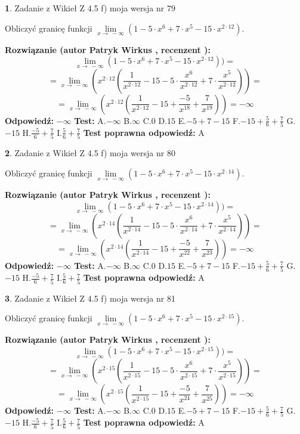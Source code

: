 \documentclass[12pt, a4paper]{article}
\theoremstyle{definition} %
\newtheorem{zad}{}
\newcommand{\zadStart}[1]{\begin{zad}#1\newline}
\newcommand{\zadStop}{\end{zad}}
\newcommand{\rozwStart}[2]{\noindent \textbf{Rozwiązanie (autor #1 , recenzent #2): }\newline}
\newcommand{\rozwStop}{\newline}
\newcommand{\odpStart}{\noindent \textbf{Odpowiedź:}\newline}
\newcommand{\odpStop}{\newline}
\newcommand{\testStart}{\noindent \textbf{Test:}\newline}
\newcommand{\testStop}{\newline}
\newcommand{\kluczStart}{\noindent \textbf{Test poprawna odpowiedź:}\newline}
\newcommand{\kluczStop}{\newline}
\begin{document}
\zadStart{Zadanie z Wikieł Z 4.5 f) moja wersja nr 79}



Obliczyć granicę funkcji  $\lim\limits_{x\to\ -\infty}(1 - 5 \cdot x^{6}+7 \cdot x^{5}- 15 \cdot x^{2\cdot12})$.
\zadStop
\rozwStart{Patryk Wirkus}{}
$$\lim\limits_{x\to\ -\infty}(1 - 5 \cdot x^{6}+7 \cdot x^{5}- 15 \cdot x^{2\cdot12}))=$$
$$=\lim\limits_{x\to\ -\infty}(x^{2\cdot12}(\frac{1}{x^{2\cdot12}}-15 -5 \cdot \frac{x^{6}}{x^{2\cdot12}}+7 \cdot \frac{x^{5}}{x^{2\cdot12}}))=$$
$$=\lim\limits_{x\to\ -\infty}(x^{2\cdot12}(\frac{1}{x^{2\cdot12}}-15 + \frac{-5}{x^{18}}+ \frac{7}{x^{19}}))=-\infty$$
\rozwStop
\odpStart
$-\infty$
\odpStop
\testStart
A.$-\infty$ B.$\infty$ C.$0$ D.$15$ E.$-5 + 7 - 15$
F.$-15+\frac{5}{6}+\frac{7}{5}$ G.$-15$
H.$\frac{-5}{6}+\frac{7}{5}$
I.$\frac{5}{6}+\frac{7}{5}$
\testStop
\kluczStart
A
\kluczStop



\zadStart{Zadanie z Wikieł Z 4.5 f) moja wersja nr 80}



Obliczyć granicę funkcji  $\lim\limits_{x\to\ -\infty}(1 - 5 \cdot x^{6}+7 \cdot x^{5}- 15 \cdot x^{2\cdot14})$.
\zadStop
\rozwStart{Patryk Wirkus}{}
$$\lim\limits_{x\to\ -\infty}(1 - 5 \cdot x^{6}+7 \cdot x^{5}- 15 \cdot x^{2\cdot14}))=$$
$$=\lim\limits_{x\to\ -\infty}(x^{2\cdot14}(\frac{1}{x^{2\cdot14}}-15 -5 \cdot \frac{x^{6}}{x^{2\cdot14}}+7 \cdot \frac{x^{5}}{x^{2\cdot14}}))=$$
$$=\lim\limits_{x\to\ -\infty}(x^{2\cdot14}(\frac{1}{x^{2\cdot14}}-15 + \frac{-5}{x^{22}}+ \frac{7}{x^{23}}))=-\infty$$
\rozwStop
\odpStart
$-\infty$
\odpStop
\testStart
A.$-\infty$ B.$\infty$ C.$0$ D.$15$ E.$-5 + 7 - 15$
F.$-15+\frac{5}{6}+\frac{7}{5}$ G.$-15$
H.$\frac{-5}{6}+\frac{7}{5}$
I.$\frac{5}{6}+\frac{7}{5}$
\testStop
\kluczStart
A
\kluczStop



\zadStart{Zadanie z Wikieł Z 4.5 f) moja wersja nr 81}



Obliczyć granicę funkcji  $\lim\limits_{x\to\ -\infty}(1 - 5 \cdot x^{6}+7 \cdot x^{5}- 15 \cdot x^{2\cdot15})$.
\zadStop
\rozwStart{Patryk Wirkus}{}
$$\lim\limits_{x\to\ -\infty}(1 - 5 \cdot x^{6}+7 \cdot x^{5}- 15 \cdot x^{2\cdot15}))=$$
$$=\lim\limits_{x\to\ -\infty}(x^{2\cdot15}(\frac{1}{x^{2\cdot15}}-15 -5 \cdot \frac{x^{6}}{x^{2\cdot15}}+7 \cdot \frac{x^{5}}{x^{2\cdot15}}))=$$
$$=\lim\limits_{x\to\ -\infty}(x^{2\cdot15}(\frac{1}{x^{2\cdot15}}-15 + \frac{-5}{x^{24}}+ \frac{7}{x^{25}}))=-\infty$$
\rozwStop
\odpStart
$-\infty$
\odpStop
\testStart
A.$-\infty$ B.$\infty$ C.$0$ D.$15$ E.$-5 + 7 - 15$
F.$-15+\frac{5}{6}+\frac{7}{5}$ G.$-15$
H.$\frac{-5}{6}+\frac{7}{5}$
I.$\frac{5}{6}+\frac{7}{5}$
\testStop
\kluczStart
A
\kluczStop
\end{document}
